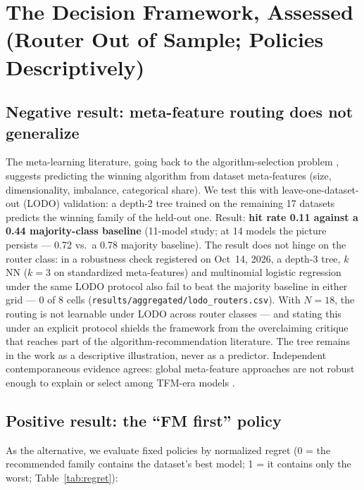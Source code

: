 \documentclass[11pt]{article}
\begin{document}
\section{The Decision Framework, Assessed (Router Out of Sample;
Policies Descriptively)}

\subsection{Negative result: meta-feature routing does not generalize}

The meta-learning literature, going back to the algorithm-selection
problem \citep{rice1976}, suggests predicting the winning algorithm from
dataset meta-features (size, dimensionality, imbalance, categorical
share). We test this with leave-one-dataset-out (LODO) validation: a
depth-2 tree trained on the remaining 17 datasets predicts the winning
family of the held-out one. Result: \textbf{hit rate 0.11 against a 0.44
majority-class baseline} (11-model study; at 14 models the picture
persists --- 0.72 vs.\ a 0.78 majority baseline). The result does not
hinge on the router class: in a robustness check registered on
Oct~14, 2026, a depth-3 tree, $k$NN ($k{=}3$ on standardized
meta-features) and multinomial logistic regression under the same LODO
protocol also fail to beat the majority baseline in either grid ---
0 of 8 cells (\texttt{results/\allowbreak aggregated/\allowbreak lodo\_\allowbreak routers.\allowbreak csv}). With
$N{=}18$, the
routing is not learnable under LODO across router classes --- and stating
this under an explicit protocol shields the framework from the
overclaiming critique that reaches part of the algorithm-recommendation
literature. The tree remains
in the work as a descriptive illustration, never as a predictor.
Independent contemporaneous evidence agrees: global meta-feature
approaches are not robust enough to explain or select among TFM-era
models \citep{herre2026}.

\subsection{Positive result: the ``FM first'' policy}

As the alternative, we evaluate fixed policies by normalized regret (0 =
the recommended family contains the dataset's best model; 1 = it contains
only the worst; Table~\ref{tab:regret}):
\end{document}
